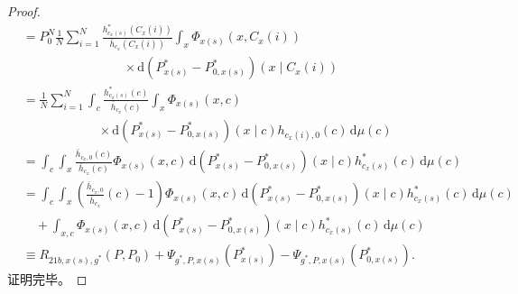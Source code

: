 \begin{proof}
\[\begin{aligned}
&=P_0^N\frac1N\sum_{i=1}^N
 \frac{h^*_{c_x(s)}(C_x(i))}{\bar h_{c_x}(C_x(i))}
 \int_x\Phi_{x(s)}(x,C_x(i))\\
&\hspace{8em}\times\mathrm d(P^*_{x(s)}-P^*_{0,x(s)})(x\mid C_x(i))\\
&=\frac1N\sum_{i=1}^N\int_c
 \frac{h^*_{c_x(s)}(c)}{\bar h_{c_x}(c)}
 \int_x\Phi_{x(s)}(x,c)\\
&\hspace{6em}\times\mathrm d(P^*_{x(s)}-P^*_{0,x(s)})(x\mid c)
 h_{c_x(i),0}(c)\,\mathrm d\mu(c)\\
&=\int_c\int_x\frac{\bar h_{c_x,0}(c)}{\bar h_{c_x}(c)}
 \Phi_{x(s)}(x,c)\,\mathrm d(P^*_{x(s)}-P^*_{0,x(s)})(x\mid c)
 h^*_{c_x(s)}(c)\,\mathrm d\mu(c)\\
&=\int_c\int_x\left(\frac{\bar h_{c_x,0}}{\bar h_{c_x}}(c)-1\right)
 \Phi_{x(s)}(x,c)\,\mathrm d(P^*_{x(s)}-P^*_{0,x(s)})(x\mid c)
 h^*_{c_x(s)}(c)\,\mathrm d\mu(c)\\
&\quad+\int_{x,c}\Phi_{x(s)}(x,c)
 \,\mathrm d(P^*_{x(s)}-P^*_{0,x(s)})(x\mid c)
 h^*_{c_x(s)}(c)\,\mathrm d\mu(c)\\
&\equiv R_{21b,x(s),g^*}(P,P_0)
 +\Psi_{g^*,P,x(s)}(P^*_{x(s)})
 -\Psi_{g^*,P,x(s)}(P^*_{0,x(s)}).
\end{aligned}
\]
证明完毕。
\end{proof}
